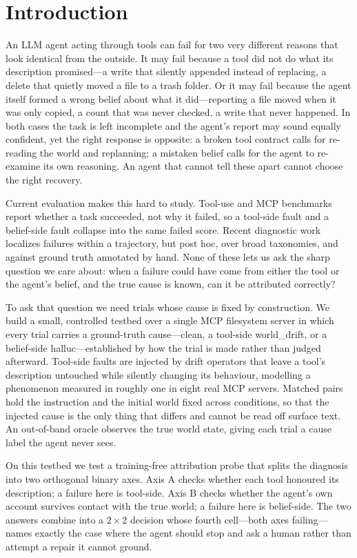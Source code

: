 \documentclass[runningheads]{llncs}
\begin{document}
\section{Introduction}
\label{sec:intro}

An LLM agent acting through tools can fail for two very different reasons that look identical from the outside. It may fail because a tool did not do what its description promised---a write that silently appended instead of replacing, a delete that quietly moved a file to a trash folder. Or it may fail because the agent itself formed a wrong belief about what it did---reporting a file moved when it was only copied, a count that was never checked, a write that never happened. In both cases the task is left incomplete and the agent's report may sound equally confident, yet the right response is opposite: a broken tool contract calls for re-reading the world and replanning; a mistaken belief calls for the agent to re-examine its own reasoning. An agent that cannot tell these apart cannot choose the right recovery.

Current evaluation makes this hard to study. Tool-use and MCP benchmarks report whether a task succeeded, not why it failed, so a tool-side fault and a belief-side fault collapse into the same failed score. Recent diagnostic work localizes failures within a trajectory, but post hoc, over broad taxonomies, and against ground truth annotated by hand. None of these lets us ask the sharp question we care about: when a failure could have come from either the tool or the agent's belief, and the true cause is known, can it be attributed correctly?

To ask that question we need trials whose cause is fixed by construction. We build a small, controlled testbed over a single MCP filesystem server in which every trial carries a ground-truth cause---\textsf{clean}, a tool-side \textsf{world\_drift}, or a belief-side \textsf{halluc}---established by how the trial is made rather than judged afterward. Tool-side faults are injected by drift operators that leave a tool's description untouched while silently changing its behaviour, modelling a phenomenon measured in roughly one in eight real MCP servers. Matched pairs hold the instruction and the initial world fixed across conditions, so that the injected cause is the only thing that differs and cannot be read off surface text. An out-of-band oracle observes the true world state, giving each trial a cause label the agent never sees.

On this testbed we test a training-free attribution probe that splits the diagnosis into two orthogonal binary axes. Axis A checks whether each tool honoured its description; a failure here is tool-side. Axis B checks whether the agent's own account survives contact with the true world; a failure here is belief-side. The two answers combine into a $2\times2$ decision whose fourth cell---both axes failing---names exactly the case where the agent should stop and ask a human rather than attempt a repair it cannot ground.
\end{document}

